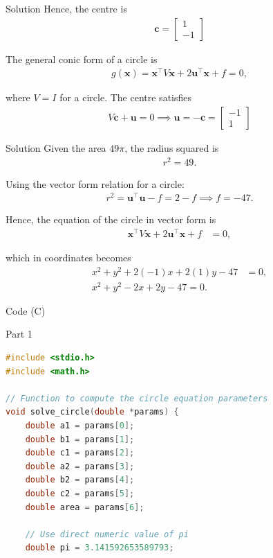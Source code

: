 \documentclass{beamer}
\begin{document}
\begin{frame}{Solution}
Hence, the centre is
\begin{align}
\mathbf{c} = \begin{bmatrix} 1 \\ -1 \end{bmatrix}
\end{align}

The general conic form of a circle is
\begin{align}
g(\mathbf{x}) = \mathbf{x}^\top V \mathbf{x} + 2 \mathbf{u}^\top \mathbf{x} + f = 0, 
\end{align}

where $V = I$ for a circle. The centre satisfies
\begin{align}
V \mathbf{c} + \mathbf{u} = 0 \implies \mathbf{u} = -\mathbf{c}
= \begin{bmatrix} -1 \\ 1 \end{bmatrix}
\end{align}
\end{frame}

\begin{frame}{Solution}
Given the area $49\pi$, the radius squared is
\begin{align}
r^2 = 49.
\end{align}

Using the vector form relation for a circle:
\begin{align}
r^2 = \mathbf{u}^\top \mathbf{u} - f = 2 - f \implies f = -47.
\end{align}

Hence, the equation of the circle in vector form is
\begin{align}
\mathbf{x}^\top V \mathbf{x} + 2 \mathbf{u}^\top \mathbf{x} + f &= 0,
\end{align}

which in coordinates becomes
\begin{align}
x^2 + y^2 + 2(-1)x + 2(1)y - 47 &= 0, \\
\boxed{x^2 + y^2 - 2x + 2y - 47 = 0}.
\end{align}
\end{frame}
\begin{frame}[fragile]{ Code (C)}
\begin{block}{Part 1}
\begin{lstlisting}[language=C, basicstyle=\ttfamily\small, keywordstyle=\color{blue}, frame=single]
#include <stdio.h>
#include <math.h>

// Function to compute the circle equation parameters
void solve_circle(double *params) {
    double a1 = params[0];
    double b1 = params[1];
    double c1 = params[2];
    double a2 = params[3];
    double b2 = params[4];
    double c2 = params[5];
    double area = params[6];

    // Use direct numeric value of pi
    double pi = 3.141592653589793;
\end{lstlisting}
\end{block}
\end{frame}
\end{document}
